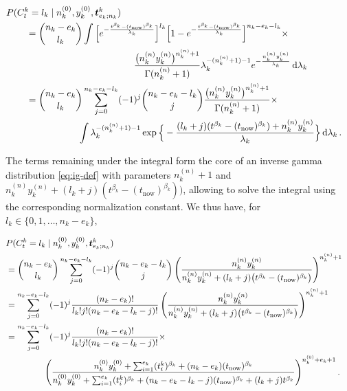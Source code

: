 \documentclass[Journal,letterpaper]{ascelike-new}
\newcommand{\dd}{\,\mathrm{d}}
\renewcommand{\vec}[1]{{\bm#1}}
\newcommand{\uz}{^{(0)}} %
\newcommand{\un}{^{(n)}} %
\def\ykz{y\uz_k}
\def\ykn{y\un_k}
\def\nkz{n\uz_k}
\def\nkn{n\un_k}
\def\tnow{t_\text{now}}
\begin{document}
\begin{linenomath*}
\begin{align}
\lefteqn{P(C^k_t = l_k\mid\nkz,\ykz, \vec{t}^k_{e_k;n_k})}\hspace*{5ex} \nonumber\\
 &= { n_k - e_k \choose l_k} \int \Big[    e^{-\frac{t^{\beta_k} - (\tnow)^{\beta_k}}{\lambda_k}}\Big]^{l_k}
                                  \Big[1 - e^{-\frac{t^{\beta_k} - (\tnow)^{\beta_k}}{\lambda_k}}\Big]^{n_k - e_k - l_k}
    \times \nonumber\\ & \hspace*{27ex}
    \frac{\big(\nkn\ykn\big)^{\nkn + 1}}{\Gamma(\nkn+1)} \lambda_k^{-(\nkn + 1) - 1} e^{-\frac{\nkn\ykn}{\lambda_k}} \dd \lambda_k \nonumber\\
 &= { n_k - e_k \choose l_k} \sum_{j=0}^{n_k-e_k-l_k} (-1)^j { n_k - e_k - l_k \choose j} \frac{\big(\nkn\ykn\big)^{\nkn + 1}}{\Gamma(\nkn+1)} 
    \times \nonumber\\ & \hspace*{13ex}
    \int \lambda_k^{-(\nkn + 1) - 1} \exp\Big\{-\frac{(l_k + j) (t^{\beta_k} - (\tnow)^{\beta_k}) + \nkn\ykn}{\lambda_k}\Big\} \dd \lambda_k\,.
\end{align}
\end{linenomath*}
%
The terms remaining under the integral form the core of an inverse gamma distribution \eqref{eq:ig-def}
with parameters $\nkn + 1$ and $\nkn\ykn + (l_k + j) (t^{\beta_k} - (\tnow)^{\beta_k}))$,
allowing to solve the integral using the corresponding normalization constant.
We thus have, for $l_k \in \{0,1,\ldots,n_k-e_k\}$,
\begin{linenomath*}
\begin{align}
\lefteqn{P(C^k_t = l_k\mid\nkz,\ykz, \vec{t}^k_{e_k;n_k})} \nonumber\\
 &= { n_k - e_k \choose l_k} \sum_{j=0}^{n_k-e_k-l_k} (-1)^j { n_k - e_k - l_k \choose j}
    \left(\frac{\nkn\ykn}{\nkn\ykn + (l_k + j) \big(t^{\beta_k} - (\tnow)^{\beta_k}\big)}\right)^{\nkn + 1} \nonumber\\
 &= \sum_{j=0}^{n_k-e_k-l_k} (-1)^j \frac{(n_k - e_k)!}{l_k! j! (n_k - e_k - l_k - j)!}   
    \left(\frac{\nkn\ykn}{\nkn\ykn + (l_k + j) \big(t^{\beta_k} - (\tnow)^{\beta_k}\big)}\right)^{\nkn + 1} \nonumber\\
 &= \sum_{j=0}^{n_k-e_k-l_k} (-1)^j \frac{(n_k - e_k)!}{l_k! j! (n_k - e_k - l_k - j)!} \times \nonumber\\ & \hspace*{10ex}  
    \left(\frac{\nkz\ykz + \sum_{i=1}^{e_k} (t_i^k)^{\beta_k} + (n_k-e_k)       (\tnow)^{\beta_k} }%
               {\nkz\ykz + \sum_{i=1}^{e_k} (t_i^k)^{\beta_k} + (n_k-e_k-l_k-j) (\tnow)^{\beta_k} + (l_k + j) t^{\beta_k} }\right)^{%
    \nkz + e_k + 1}.
\label{eq:postpred-priorparams}
\end{align}
\end{linenomath*}
\end{document}
